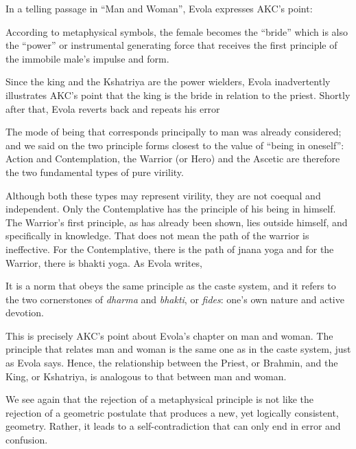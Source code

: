 In a telling passage in ``Man and Woman'', Evola expresses AKC's point:

\begin{quotex}
According to metaphysical symbols, the female becomes the ``bride'' which is also the ``power'' or instrumental generating force that receives the first principle of the immobile male's impulse and form.
\end{quotex}


Since the king and the Kshatriya are the power wielders, Evola inadvertently illustrates AKC's point that the king is the bride in relation to the priest. Shortly after that, Evola reverts back and repeats his error

\begin{quotex}
The mode of being that corresponds principally to man was already considered; and we said on the two principle forms closest to the value of ``being in oneself'': Action and Contemplation, the Warrior (or Hero) and the Ascetic are therefore the two fundamental types of pure virility.
\end{quotex}


Although both these types may represent virility, they are not coequal and independent. Only the Contemplative has the principle of his being in himself. The Warrior's first principle, as has already been shown, lies outside himself, and specifically in knowledge. That does not mean the path of the warrior is ineffective. For the Contemplative, there is the path of jnana yoga and for the Warrior, there is bhakti yoga. As Evola writes,

\begin{quotex}
It is a norm that obeys the same principle as the caste system, and it refers to the two cornerstones of \emph{dharma} and \emph{bhakti}, or \emph{fides}: one's own nature and active devotion.
\end{quotex}


This is precisely AKC's point about Evola's chapter on man and woman. The principle that relates man and woman is the same one as in the caste system, just as Evola says. Hence, the relationship between the Priest, or Brahmin, and the King, or Kshatriya, is analogous to that between man and woman.

We see again that the rejection of a metaphysical principle is not like the rejection of a geometric postulate that produces a new, yet logically consistent, geometry. Rather, it leads to a self-contradiction that can only end in error and confusion.


